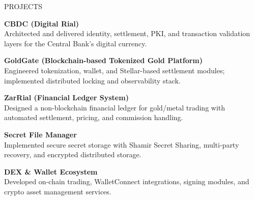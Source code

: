 \documentclass{resume}
\begin{document}

\begin{rSection}{PROJECTS}

\textbf{CBDC (Digital Rial)} \\
Architected and delivered identity, settlement, PKI, and transaction validation layers for the Central Bank's digital currency.

\textbf{GoldGate (Blockchain-based Tokenized Gold Platform)} \\
Engineered tokenization, wallet, and Stellar-based settlement modules; implemented distributed locking and observability stack.

\textbf{ZarRial (Financial Ledger System)} \\
Designed a non-blockchain financial ledger for gold/metal trading with automated settlement, pricing, and commission handling.

\textbf{Secret File Manager} \\
Implemented secure secret storage with Shamir Secret Sharing, multi-party recovery, and encrypted distributed storage.

\textbf{DEX \& Wallet Ecosystem} \\
Developed on-chain trading, WalletConnect integrations, signing modules, and crypto asset management services.

\end{rSection}
\end{document}
